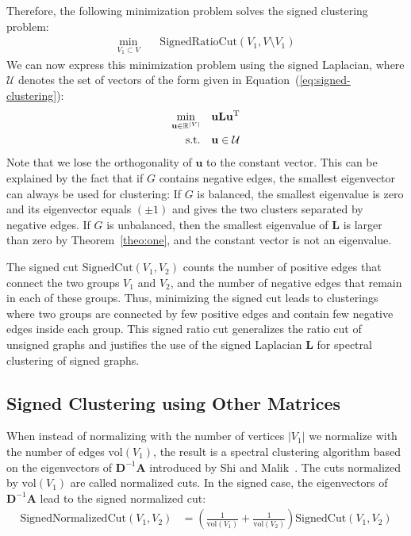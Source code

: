 \documentclass[11pt,a4paper]{book}
\begin{document}
Therefore, the following minimization problem solves the signed
clustering problem:
\begin{align}
  \min_{V_1 \subset V} \quad & \mathrm{SignedRatioCut}(V_1, V \setminus V_1) 
\end{align}
We can now express this minimization problem using the signed Laplacian,
where $\mathcal U$ denotes the set of vectors of the form given 
in Equation~(\ref{eq:signed-clustering}): 
\begin{align}
  \min_{\mathbf u \in \mathbb R^{|V|}} \quad & \mathbf u\mathbf L
  \mathbf u^{\mathrm T} \\
  \textnormal{s.t.} \quad & \mathbf u \in \mathcal U \nonumber
\end{align}
Note that we lose the orthogonality of $\mathbf u$ to the constant vector.  This
can be explained by the fact that if $G$ contains negative edges, the
smallest eigenvector can always be used for clustering:  If $G$ is
balanced, the smallest eigenvalue is zero and its eigenvector equals
$(\pm 1)$ and gives the two clusters separated by negative edges.  If $G$
is unbalanced, then the smallest eigenvalue of $\mathbf L$ is larger
than zero by Theorem~\ref{theo:one}, and the constant vector is not an
eigenvalue. 

The signed cut $\mathrm{SignedCut}(V_1,V_2)$ counts the number of positive edges that
connect the two groups $V_1$ and $V_2$, and the number of negative edges
that remain in each of these groups.  Thus, minimizing the signed cut
leads to clusterings where two groups are connected by few positive
edges and contain few negative edges inside each group. 
This signed ratio cut generalizes the ratio cut of unsigned graphs and
justifies the use of the signed Laplacian $\mathbf L$ for spectral
clustering of signed graphs. 

\subsection{Signed Clustering using Other Matrices}
When instead of normalizing with the number of vertices $|V_1|$ we
normalize with the number of edges $\mathrm{vol}(V_1)$, the result is a
spectral clustering algorithm based on the eigenvectors of
$\mathbf D^{-1}\mathbf A$ introduced by Shi and Malik~\cite{b452}.  The
cuts normalized 
by $\mathrm{vol}(V_1)$ are called normalized cuts. 
In the signed case, the eigenvectors of $\mathbf D^{-1}\mathbf A$ lead to the
signed normalized cut:
\begin{align}
  \mathrm{SignedNormalizedCut}(V_1,V_2) &=
  \left(\frac 1 {\mathrm{vol}(V_1)}+\frac 1 {\mathrm{vol}(V_2)}\right) 
  \mathrm{SignedCut}(V_1,V_2)
\end{align}
\end{document}
